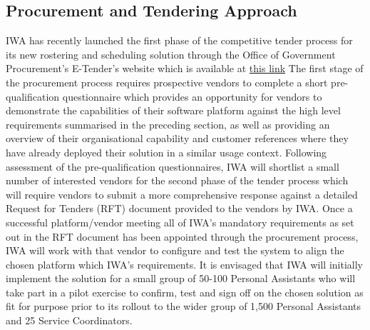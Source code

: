 \documentclass[a4paper,12pt]{article}
\begin{document}
\subsection {Procurement and Tendering Approach}
IWA has recently launched the first phase of the competitive tender process for its new rostering and scheduling solution through the Office of Government Procurement's E-Tender's website which is available at \href{https://irl.eu-supply.com/app/rfq/publicpurchase_frameset.asp?PID=110399&B=ETENDERS_SIMPLE&PS=1&PP=ctm/Supplier/publictenders}{this link}
The first stage of the procurement process requires prospective vendors to complete a short pre-qualification questionnaire which provides an opportunity for vendors to demonstrate the capabilities of their software platform against the high level requirements summarised in the preceding section, as well as providing an overview of their organisational capability and customer references where they have already deployed their solution in a similar usage context.  
Following assessment of the pre-qualification questionnaires, IWA will shortlist a small number of interested vendors for the second phase of the tender process which will require vendors to submit a more comprehensive response against a detailed Request for Tenders (RFT) document provided to the vendors by IWA. Once a successful platform/vendor meeting all of IWA's mandatory requirements as set out in the RFT document has been appointed through the procurement process, IWA will work with that vendor to configure and test the system to align the chosen platform which IWA's requirements. It is envisaged that IWA will initially implement the solution for a small group of 50-100 Personal Assistants who will take part in a pilot exercise to confirm, test and sign off on the chosen solution as fit for purpose prior to its rollout to the wider group of 1,500 Personal Assistants and 25 Service Coordinators.
\newpage
\end{document}
